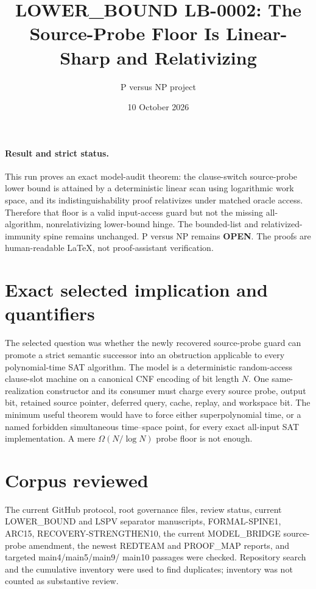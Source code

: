 \documentclass[11pt]{article}
\title{LOWER\_BOUND LB-0002: The Source-Probe Floor Is Linear-Sharp and Relativizing}
\author{P versus NP project}
\date{10 October 2026}
\begin{document}
\maketitle

\paragraph{Result and strict status.}
This run proves an exact model-audit theorem: the clause-switch
source-probe lower bound is attained by a deterministic linear scan using
logarithmic work space, and its indistinguishability proof relativizes
under matched oracle access. Therefore that floor is a valid input-access
guard but not the missing all-algorithm, nonrelativizing lower-bound hinge.
The bounded-list and relativized-immunity spine remains unchanged.
P versus NP remains \textbf{OPEN}. The proofs are human-readable LaTeX,
not proof-assistant verification.

\section{Exact selected implication and quantifiers}
The selected question was whether the newly recovered source-probe guard
can promote a strict semantic successor into an obstruction applicable to
every polynomial-time SAT algorithm. The model is a deterministic
random-access clause-slot machine on a canonical CNF encoding of bit length
$N$. One same-realization constructor and its consumer must charge every
source probe, output bit, retained source pointer, deferred query, cache,
replay, and workspace bit. The minimum useful theorem would have to force
either superpolynomial time, or a named forbidden simultaneous
time--space point, for every exact all-input SAT implementation. A mere
$\Omega(N/\log N)$ probe floor is not enough.

\section{Corpus reviewed}
The current GitHub protocol, root governance files, review status, current
LOWER\_BOUND and LSPV separator manuscripts, FORMAL-SPINE1, ARC15,
RECOVERY-STRENGTHEN10, the current MODEL\_BRIDGE source-probe amendment,
the newest REDTEAM and PROOF\_MAP reports, and targeted main4/main5/main9/
main10 passages were checked. Repository search and the cumulative
inventory were used to find duplicates; inventory was not counted as
substantive review.
\end{document}
